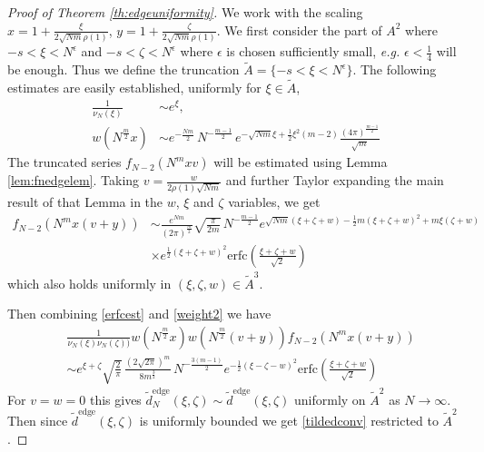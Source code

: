 \documentclass[11pt,reqno]{amsproc}
\numberwithin{equation}{section}
\numberwithin{theorem}{section}
\begin{document}
\begin{proof}[Proof of Theorem \ref{th:edgeuniformity}]
We work with the scaling $x = 1+\frac{\xi}{2\sqrt{Nm}\rho(1)}$, $y = 1+\frac{\zeta}{2\sqrt{Nm}\rho(1)}$.
We first consider the part of $A^{2}$ where $-s < \xi < N^{\epsilon}$ and $-s < \zeta < N^{\epsilon}$ where $\epsilon$ is chosen sufficiently small, \textit{e.g.} $\epsilon < \frac{1}{4}$ will be enough. Thus we define the truncation $\tilde{A} = \{-s < \xi < N^{\epsilon}\}$. The following estimates are easily established, uniformly for $\xi \in \tilde{A}$,
\begin{align}
\frac{1}{\nu_{N}(\xi)} &\sim e^{\xi}, \\
w(N^{\frac{m}{2}}x) &\sim e^{-\frac{Nm}{2}}\,N^{-\frac{m-1}{2}}\,e^{-\sqrt{Nm}\xi+\frac{1}{2}\xi^{2}(m-2)}\frac{(4\pi)^{\frac{m-1}{2}}}{\sqrt{m}} \label{weight2}
\end{align}
The truncated series $f_{N-2}(N^{m}xv)$ will be estimated using Lemma \ref{lem:fnedgelem}. Taking $v=\frac{w}{2\rho(1)\sqrt{Nm}}$ and further Taylor expanding the main result of that Lemma in the $w$, $\xi$ and $\zeta$ variables, we get
\begin{equation}
\begin{split}
f_{N-2}(N^{m}x(v+y)) &\sim \frac{e^{Nm}}{(2\pi)^{\frac{m}{2}}}\sqrt{\frac{\pi}{2m}}\,N^{-\frac{m-1}{2}}e^{\sqrt{Nm}(\xi+\zeta+w)-\frac{1}{2}m(\xi+\zeta+w)^{2}+m\xi(\zeta+w)}\\
&\times e^{\frac{1}{2}(\xi+\zeta+w)^{2}}\mathrm{erfc}\left(\frac{\xi+\zeta+w}{\sqrt{2}}\right) \label{erfcest}
\end{split}
\end{equation}
which also holds uniformly in $(\xi,\zeta,w) \in \tilde{A}^{3}$. 

Then combining \eqref{erfcest} and \eqref{weight2} we have
\begin{equation}
\begin{split}
&\frac{1}{\nu_{N}(\xi)\nu_{N}(\zeta))}w(N^{\frac{m}{2}}x)w(N^{\frac{m}{2}}(v+y))f_{N-2}(N^{m}x(v+y))\\
&\sim e^{\xi+\zeta}\sqrt{\frac{2}{\pi}}\,\frac{(2\sqrt{2\pi})^{m}}{8m^{\frac{3}{2}}}\,N^{-\frac{3(m-1)}{2}}e^{-\frac{1}{2}(\xi-\zeta-w)^{2}}\mathrm{erfc}\left(\frac{\xi+\zeta+w}{\sqrt{2}}\right) \label{wwfasy}
\end{split}
\end{equation}
For $v=w=0$ this gives $\tilde{d}^{\mathrm{edge}}_{N}(\xi,\zeta) \sim \tilde{d}^{\mathrm{edge}}(\xi,\zeta)$ uniformly on $\tilde{A}^{2}$ as $N \to \infty$. Then since $\tilde{d}^{\mathrm{edge}}(\xi,\zeta)$ is uniformly bounded we get \eqref{tildedconv} restricted to $\tilde{A}^{2}$. 


\end{proof}
\end{document}
